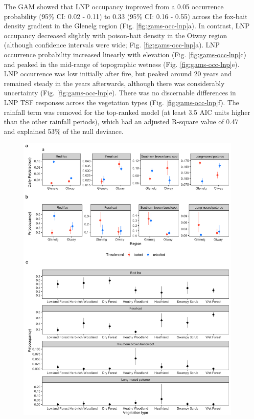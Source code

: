 \documentclass[11pt,a4paper,titlepage,twoside,openright]{style/unimelbthesis}
\begin{document}
\begin{mainmatter}
The GAM showed that LNP occupancy improved from a 0.05 occurrence probability (95\% CI: 0.02 - 0.11) to 0.33 (95\% CI: 0.16 - 0.55) across the fox-bait density gradient in the Glenelg region (Fig. \ref{fig:gams-occ-lnp}a). In contrast, LNP occupancy decreased slightly with poison-bait density in the Otway region (although confidence intervals were wide; Fig. \ref{fig:gams-occ-lnp}a). LNP occurrence probability increased linearly with elevation (Fig. \ref{fig:gams-occ-lnp}c) and peaked in the mid-range of topographic wetness (Fig. \ref{fig:gams-occ-lnp}e). LNP occurrence was low initially after fire, but peaked around 20 years and remained steady in the years afterwards, although there was considerably uncertainty (Fig. \ref{fig:gams-occ-lnp}e). There was no discernable differences in LNP TSF responses across the vegetation types (Fig. \ref{fig:gams-occ-lnp}f). The rainfall term was removed for the top-ranked model (at least 3.5 AIC units higher than the other rainfall periods), which had an adjusted R-square value of 0.47 and explained 53\% of the null deviance.

\newpage
\begin{figure}

{\centering \includegraphics[width=1\linewidth]{figure/occ_det_ubms} 

}
\end{figure}
\end{mainmatter}
\end{document}
